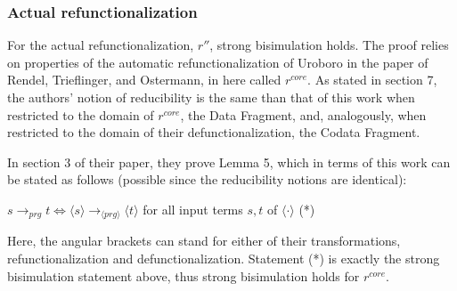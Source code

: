 \documentclass[11pt]{article} %
\begin{document}
\subsubsection{Actual refunctionalization}

For the actual refunctionalization, $r''$, strong bisimulation holds. The proof relies on properties of the automatic refunctionalization of Uroboro in the paper of Rendel, Trieflinger, and Ostermann, in here called $r^{core}$. As stated in section 7, the authors' notion of reducibility is the same than that of this work when restricted to the domain of $r^{core}$, the Data Fragment, and, analogously, when restricted to the domain of their defunctionalization, the Codata Fragment.

In section 3 of their paper, they prove Lemma 5, which in terms of this work can be stated as follows (possible since the reducibility notions are identical):

$s \longrightarrow_{prg} t \iff \langle s \rangle \longrightarrow_{\langle prg \rangle} \langle t \rangle$ for all input terms $s,t$ of $\langle \cdot \rangle$ (*)

Here, the angular brackets can stand for either of their transformations, refunctionalization and defunctionalization. Statement (*) is exactly the strong bisimulation statement above, thus strong bisimulation holds for $r^{core}$.
\end{document}

